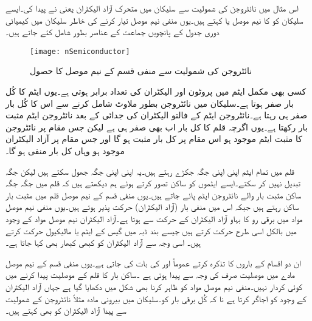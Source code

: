 اس مثال میں نائٹروجن کی شمولیت سے سلیکان میں متحرک آزاد الیکٹران یعنی   نے  پیدا کی۔ایسے سلیکان کو  کا نیم موصل یا 
  کہتے ہیں۔یوں منفی نیم موصل تیار کرنے کی خاطر سلیکان میں کیمیائی دوری جدول کے پانچویں جماعت کے عناصر بطور  شامل کئے جاتے ہیں۔
\begin{figure}
\centering
\texttt{[image: nSemiconductor]}
\caption{نائٹروجن کی شمولیت سے منفی قسم کے نیم موصل کا حصول}
\label{شکل_منفی_نیم_موصل_کا_حصول}
\end{figure}
کسی بھی مکمل ایٹم میں پروٹون اور الیکٹران کی تعداد برابر ہوتی ہے۔یوں ایٹم کا کُل بار صفر ہوتا ہے۔سلیکان میں نائٹروجن بطور ملاوٹ شامل کرنے سے اس کا کُل بار صفر ہی رہتا ہے۔نائٹروجن ایٹم کے فالتو الیکٹران کی جدائی کے بعد نائٹروجن ایٹم مثبت بار رکھتا ہے۔یوں اگرچہ قلم کا کل بار اب بھی صفر ہی ہے لیکن جس مقام پر نائٹروجن کا مثبت ایٹم موجود ہو اس مقام پر کل بار مثبت ہو گا اور جس مقام پر آزاد الیکٹران موجود ہو وہاں کل بار منفی ہو گا۔

قلم میں تمام ایٹم اپنی اپنی جگہ جکڑے رہتے ہیں۔یہ اپنی اپنی جگہ جھول سکتے ہیں لیکن جگہ تبدیل نہیں کر سکتے۔ایسے ایٹموں کو ساکن تصور کرتے ہوئے ہم دیکھتے ہیں کہ قلم میں جگہ جگہ ساکن مثبت بار والے نائٹروجن ایٹم پائے جاتے ہیں۔یوں منفی قسم کے نیم موصل قلم میں مثبت بار ساکن رہتے ہیں جبکہ اس میں منفی بار (آزاد الیکٹران) حرکت پذیر ہوتے ہیں۔یوں منفی نیم موصل مواد میں برقی رو کا بہاو آزاد الیکٹران کے حرکت سے ہوتا ہے۔آزاد الیکٹران نیم موصل مواد کے وجود میں بالکل اسی طرح حرکت کرتے ہیں جیسے بند ڈبہ میں گیس کے ایٹم یا مالیکیول حرکت کرتے ہیں۔ اسی وجہ سے آزاد الیکٹران کو کبھی کبھار    بھی کہا جاتا ہے۔

ان دو اقسام کے باروں کا تذکرہ کرتے عموماً   اور   کی بات کی جاتی ہے۔یوں منفی قسم کے نیم موصل مادے میں موصلیت صرف  کی وجہ سے پیدا ہوتی ہے ۔ساکن بار کا قلم کے موصلیت پیدا کرنے  میں کوئی کردار نہیں۔منفی نیم موصل مواد کو ظاہر کرنا بھی شکل  میں دکھایا گیا ہے جہاں  آزاد الیکٹران کے وجود کو اجاگر کرتا ہے نا کہ کُل برقی بار کو۔سلیکان میں بیرونی مادہ مثلاً نائٹروجن  کے شمولیت سے پیدا آزاد الیکٹران کو   بھی کہتے ہیں۔

